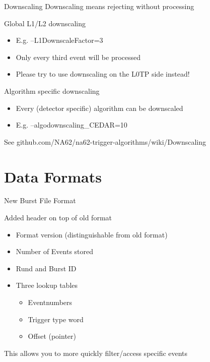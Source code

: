 \begin{frame}{Downscaling}{}
	Downscaling means rejecting without processing
	\begin{block}{Global L1/L2 downscaling}
		\begin{itemize}
		  \item E.g. --L1DownscaleFactor=3
		  \item Only every third event will be processed
		  \item Please try to use downscaling on the L0TP side instead!
		\end{itemize}
	\end{block}
	
	\begin{block}{Algorithm specific downscaling}
		\begin{itemize}
		  \item Every (detector specific) algorithm can be downscaled
		  \item E.g. --algodownscaling\_CEDAR=10
		\end{itemize}
	\end{block}
	
	\vspace{0.5cm}
	See github.com/NA62/na62-trigger-algorithms/wiki/Downscaling
\end{frame}


\section*{Data Formats}

\begin{frame}{New Burst File Format}{}
	\begin{block}{Added header on top of old format}
		\begin{itemize}
		  \item Format version (distinguishable from old format)
		  \item Number of Events stored
		  \item Rund and Burst ID
		  \item Three lookup tables
		  	\begin{itemize}
			  \item Eventnumbers
			  \item Trigger type word
			  \item Offset (pointer) 
			\end{itemize}
		\end{itemize}
	\end{block}
	This allows you to more quickly filter/access specific events
\end{frame}

